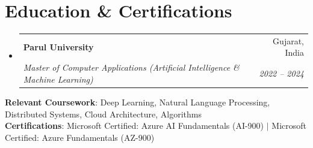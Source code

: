 \documentclass[letterpaper,11pt]{article}
\makeatletter
\newcommand{\resumeSubheading}[4]{
  \vspace{-2pt}\item
    \begin{tabular*}{0.97\textwidth}[t]{l@{\extracolsep{\fill}}r}
      \textbf{#1} & #2 \\
      \textit{\small#3} & \textit{\small #4} \\
    \end{tabular*}\vspace{-7pt}
}
\newcommand{\resumeSubHeadingListStart}{\begin{itemize}[leftmargin=0.15in, label={}]}
\newcommand{\resumeSubHeadingListEnd}{\end{itemize}}
\makeatother
\begin{document}
\section{Education \& Certifications}
  \resumeSubHeadingListStart
    \resumeSubheading
      {Parul University}{Gujarat, India}
      {Master of Computer Applications (Artificial Intelligence \& Machine Learning)}{2022 -- 2024}
  \resumeSubHeadingListEnd
  \vspace{-5pt}
  \begin{itemize}[leftmargin=0.15in, label={}]
    \small{\item{
     \textbf{Relevant Coursework}{: Deep Learning, Natural Language Processing, Distributed Systems, Cloud Architecture, Algorithms} \\
     \textbf{Certifications}{: Microsoft Certified: Azure AI Fundamentals (AI-900) $|$ Microsoft Certified: Azure Fundamentals (AZ-900)}
    }}
  \end{itemize}


\end{document}
